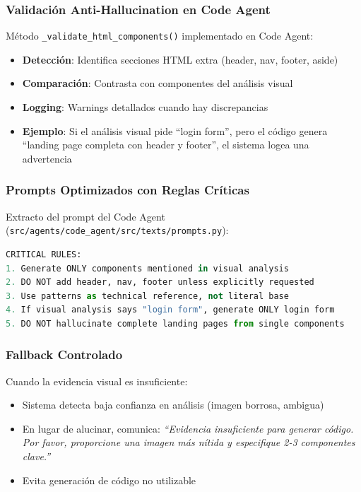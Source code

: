 \documentclass[12pt,a4paper]{article}
\begin{document}
\subsubsection{Validación Anti-Hallucination en Code Agent}

Método \texttt{\_validate\_html\_components()} implementado en Code Agent:

\begin{itemize}
    \item \textbf{Detección}: Identifica secciones HTML extra (header, nav, footer, aside)
    \item \textbf{Comparación}: Contrasta con componentes del análisis visual
    \item \textbf{Logging}: Warnings detallados cuando hay discrepancias
    \item \textbf{Ejemplo}: Si el análisis visual pide ``login form'', pero el código genera ``landing page completa con header y footer'', el sistema logea una advertencia
\end{itemize}

\subsubsection{Prompts Optimizados con Reglas Críticas}

Extracto del prompt del Code Agent (\texttt{src/agents/code\_agent/src/texts/prompts.py}):

\begin{lstlisting}[language=Python,caption={Fragmento de Prompt Anti-Hallucination}]
CRITICAL RULES:
1. Generate ONLY components mentioned in visual analysis
2. DO NOT add header, nav, footer unless explicitly requested
3. Use patterns as technical reference, not literal base
4. If visual analysis says "login form", generate ONLY login form
5. DO NOT hallucinate complete landing pages from single components
\end{lstlisting}

\subsubsection{Fallback Controlado}

Cuando la evidencia visual es insuficiente:

\begin{itemize}
    \item Sistema detecta baja confianza en análisis (imagen borrosa, ambigua)
    \item En lugar de alucinar, comunica: \textit{``Evidencia insuficiente para generar código. Por favor, proporcione una imagen más nítida y especifique 2-3 componentes clave.''}
    \item Evita generación de código no utilizable
\end{itemize}
\end{document}

